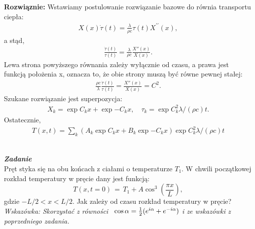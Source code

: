 \documentclass[11pt,a4paper]{article}
\newcounter{zadanie}\newcommand{\zadanie}[1][]{\addtocounter{zadanie}{1} ~\\  {\bf \emph{Zadanie \arabic{zadanie} #1 }} \\}
\begin{document}
\vspace{0.2cm}
\textbf{Rozwiąznie:} 
Wstawiamy postulowanie rozwiązanie bazowe do równia transportu ciepła:
\begin{align}
X(x) \dot{\tau}(t) = \frac{\lambda}{\rho c} \tau(t) X^{\prime \prime}(x), 
\end{align}
a stąd,
\begin{align}
\frac{\dot{\tau}(t)}{\tau(t)}= \frac{\lambda}{\rho c} \frac{X''(x)}{X(x)}.
\end{align}
Lewa strona powyższego równania zależy wyłącznie od czasu, a prawa jest funkcją położenia x, oznacza to, że obie strony muszą być równe pewnej stałej:
\begin{align}
\frac{\rho c}{\lambda}  \frac{\dot{\tau}(t)}{\tau(t)}= \frac{X''(x)}{X(x)}= C^2.
\end{align}
Szukane rozwiązanie jest superpozycja:
\begin{align}
X_k = \exp{C_k x} + \exp{-C_k x}, \quad \tau_k = \exp{C_k^2 \lambda /(\rho c) t}.
\end{align} 
Ostatecznie, 
\begin{align}
T(x, t) = \sum_k \left( A_k \exp{C_k x} + B_k \exp{-C_k x} \right) \exp{C_k^2 \lambda /(\rho c) t} \label{eq:roz}
\end{align}

\newpage
 
\zadanie
Pręt styka się na obu końcach z ciałami o temperaturze $T_1$.
W chwili początkowej rozkład temperatury w pręcie dany jest funkcją:
\[ T(x,t=0) \,=\, T_1 + A \cos^3 \left(\frac{\pi x}{L}\right), \]
gdzie $-L/2 < x < L/2$.
Jak zależy od czasu rozkład temperatury w pręcie?\\[1mm]
{\em Wskazówka: Skorzystać z równości
~$\cos{\alpha} = {1\over 2} (e^{i\alpha}+e^{-i\alpha})$ i ze wskazówki z poprzedniego zadania.}
\end{document}

